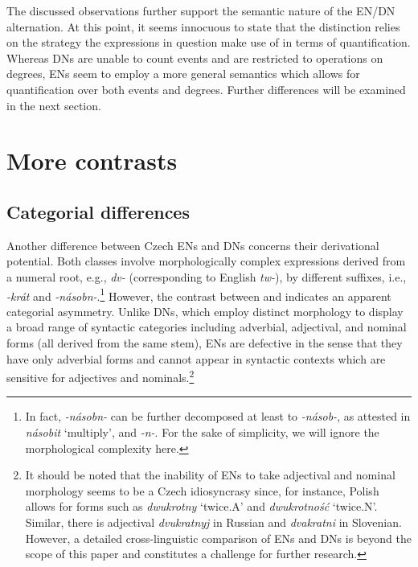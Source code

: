 \documentclass[output=paper,modfonts,hidelinks,newtxmath
\ChapterDOI{10.5281/zenodo.2545513}
]{langscibook}
\begin{document}
\noindent The discussed observations further support the semantic nature of the EN/DN alternation. At this point, it seems innocuous to state that the distinction relies on the strategy the expressions in question make use of in terms of quantification. Whereas DNs are unable to count events and are restricted to operations on degrees, ENs seem to employ a more general semantics which allows for quantification over both events and degrees. Further differences will be examined in the next section.

\section{More contrasts}\label{more-contrasts}

\subsection{Categorial differences}\label{categorial-differences}

Another difference between Czech ENs and DNs concerns their derivational potential. Both classes involve morphologically complex expressions derived from a numeral root, e.g., \textit{dv-} (corresponding to English \textit{tw-}), by different suffixes, i.e., \textit{-krát} and \textit{-násobn-}.\footnote{In fact, \textit{-násobn-} can be further decomposed at least to \textit{-násob-}, as attested in \textit{násobit} `multiply', and \textit{-n-}. For the sake of simplicity, we will ignore the morphological complexity here.} However, the contrast between  and  indicates an apparent categorial asymmetry. Unlike DNs, which employ distinct morphology to display a broad range of syntactic categories including adverbial, adjectival, and nominal forms (all derived from the same stem), ENs are defective in the sense that they have only adverbial forms and cannot appear in syntactic contexts which are sensitive for adjectives and nominals.\footnote{It should be noted that the inability of ENs to take adjectival and nominal morphology seems to be a Czech idiosyncrasy since, for instance, Polish allows for forms such as \textit{dwukrotny} `twice.A' and \textit{dwukrotność} `twice.N'. Similar, there is adjectival \textit{dvukratnyj} in Russian and \textit{dvakratni} in Slovenian. However, a detailed cross-linguistic comparison of ENs and DNs is beyond the scope of this paper and constitutes a challenge for further research.}
\end{document}
